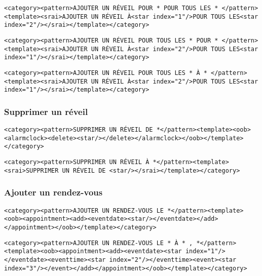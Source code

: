 \begin{lstlisting}[frame=none,aboveskip=0.5em]
<category><pattern>AJOUTER UN RÉVEIL POUR * POUR TOUS LES * </pattern><template><srai>AJOUTER UN RÉVEIL À<star index="1"/>POUR TOUS LES<star index="2"/></srai></template></category>
\end{lstlisting}

\begin{lstlisting}[frame=none,aboveskip=0.5em]
<category><pattern>AJOUTER UN RÉVEIL POUR TOUS LES * POUR * </pattern><template><srai>AJOUTER UN RÉVEIL À<star index="2"/>POUR TOUS LES<star index="1"/></srai></template></category>
\end{lstlisting}

\begin{lstlisting}[frame=none,aboveskip=0.5em]
<category><pattern>AJOUTER UN RÉVEIL POUR TOUS LES * À * </pattern><template><srai>AJOUTER UN RÉVEIL À<star index="2"/>POUR TOUS LES<star index="1"/></srai></template></category>
\end{lstlisting}

\subsubsection{Supprimer un réveil}
\begin{lstlisting}[frame=none,aboveskip=0.5em]
<category><pattern>SUPPRIMER UN RÉVEIL DE *</pattern><template><oob>
<alarmclock><delete><star/></delete></alarmclock></oob></template></category>
\end{lstlisting}

\begin{lstlisting}[frame=none,aboveskip=0.5em]
<category><pattern>SUPPRIMER UN RÉVEIL À *</pattern><template><srai>SUPPRIMER UN RÉVEIL DE <star/></srai></template></category>
\end{lstlisting}

\subsubsection{Ajouter un rendez-vous}
\begin{lstlisting}[frame=none,aboveskip=0.5em]
<category><pattern>AJOUTER UN RENDEZ-VOUS LE *</pattern><template><oob><appointment><add><eventdate><star/></eventdate></add></appointment></oob></template></category>
\end{lstlisting}

\begin{lstlisting}[frame=none,aboveskip=0.5em]
<category><pattern>AJOUTER UN RENDEZ-VOUS LE * À * , *</pattern><template><oob><appointment><add><eventdate><star index="1"/></eventdate><eventtime><star index="2"/></eventtime><event><star index="3"/></event></add></appointment></oob></template></category>
\end{lstlisting}


